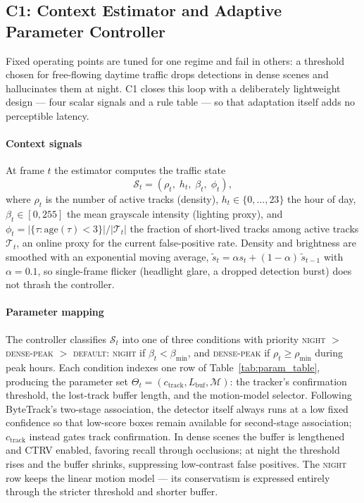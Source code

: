 \subsection{C1: Context Estimator and Adaptive Parameter Controller}
\label{subsec:c1}

Fixed operating points are tuned for one regime and fail in others: a
threshold chosen for free-flowing daytime traffic drops detections in
dense scenes and hallucinates them at night.
C1 closes this loop with a deliberately lightweight design --- four
scalar signals and a rule table --- so that adaptation itself adds no
perceptible latency.

\paragraph{Context signals}
At frame $t$ the estimator computes the traffic state
\begin{equation}
  \mathcal{S}_t = \left(\rho_t,\; h_t,\; \beta_t,\; \phi_t\right),
  \label{eq:state}
\end{equation}
where $\rho_t$ is the number of active tracks (density), $h_t \in
\{0,\dots,23\}$ the hour of day, $\beta_t \in [0,255]$ the mean
grayscale intensity (lighting proxy), and
$\phi_t = |\{\tau : \mathrm{age}(\tau) < 3\}| / |\mathcal{T}_t|$
the fraction of short-lived tracks among active tracks
$\mathcal{T}_t$, an online proxy for the current false-positive rate.
Density and brightness are smoothed with an exponential moving average,
$\tilde{s}_t = \alpha s_t + (1-\alpha)\,\tilde{s}_{t-1}$ with
$\alpha = 0.1$, so single-frame flicker (headlight glare, a dropped
detection burst) does not thrash the controller.

\paragraph{Parameter mapping}
The controller classifies $\mathcal{S}_t$ into one of three conditions
with priority \textsc{night} $>$ \textsc{dense-peak} $>$
\textsc{default}: \textsc{night} if $\beta_t < \beta_{\min}$, and
\textsc{dense-peak} if $\rho_t \geq \rho_{\min}$ during peak hours.
Each condition indexes one row of Table~\ref{tab:param_table},
producing the parameter set
$\Theta_t = (c_{\mathrm{track}}, L_{\mathrm{buf}}, \mathcal{M})$:
the tracker's confirmation threshold, the lost-track buffer length, and
the motion-model selector.
Following ByteTrack's two-stage association, the detector itself always
runs at a low fixed confidence so that low-score boxes remain available
for second-stage association; $c_{\mathrm{track}}$ instead gates track
confirmation.
In dense scenes the buffer is lengthened and CTRV enabled, favoring
recall through occlusions; at night the threshold rises and the buffer
shrinks, suppressing low-contrast false positives.
The \textsc{night} row keeps the linear motion model --- its
conservatism is expressed entirely through the stricter threshold and
shorter buffer.

